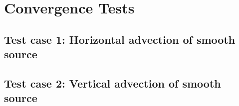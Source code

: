 %
\clearpage
\section{Convergence Tests}\label{ApxTestSecConv}

\subsection{Test case 1: Horizontal advection of smooth source}
\clearpage
\subsection{Test case 2: Vertical advection of smooth source}
\clearpage
